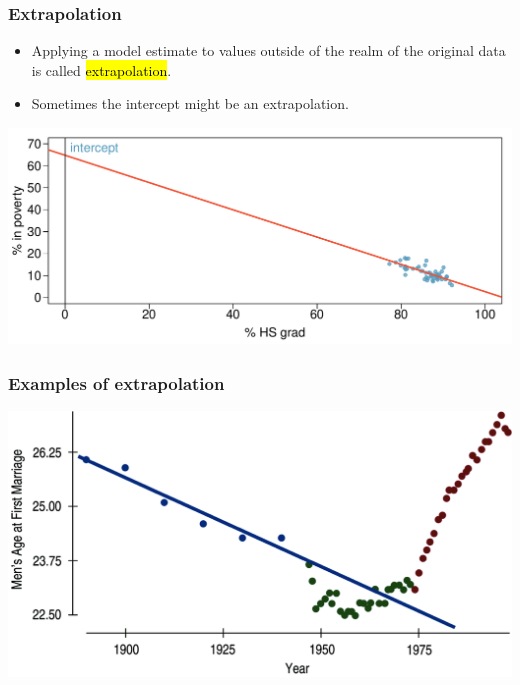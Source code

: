 \begin{frame}
\frametitle{Extrapolation}

\begin{itemize}

\item Applying a model estimate to values outside of the realm of the original data is called \hl{extrapolation}.

\item Sometimes the intercept might be an extrapolation.

\end{itemize}

\begin{center}
\includegraphics[width=\textwidth]{7-2_least_square_reg/figures/poverty/poverty_hsgrad_line_wide}
\end{center}

\end{frame}


\begin{frame}
\frametitle{Examples of extrapolation}

\begin{center}
\includegraphics[width=\textwidth]{7-2_least_square_reg/figures/extrapolation}
\end{center}

\end{frame}

